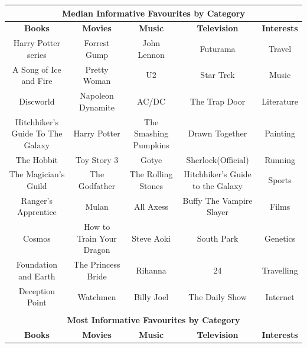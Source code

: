 
\begin{table}[t!] \centering 

{\small
\begin{tabular}{|c|c|c|c|c|}
\hline 
\multicolumn{5}{|c|}{\textbf{Median Informative Favourites by Category}}\\
\hline 
\textbf{Books} & \textbf{Movies} & \textbf{Music} & \textbf{Television} & \textbf{Interests} \\
\hline \hline
Harry Potter series&Forrest Gump&John Lennon&Futurama&Travel\\
\hline
A Song of Ice and Fire&Pretty Woman&U2&Star Trek&Music\\
\hline
Discworld&Napoleon Dynamite&AC/DC&The Trap Door&Literature\\
\hline
Hitchhiker's Guide To The Galaxy&Harry Potter&The Smashing Pumpkins&Drawn Together&Painting\\
\hline
The Hobbit&Toy Story 3&Gotye&Sherlock(Official)&Running\\
\hline
The Magician's Guild&The Godfather&The Rolling Stones&Hitchhiker's Guide to the Galaxy&Sports\\
\hline
Ranger's Apprentice&Mulan&All Axess&Buffy The Vampire Slayer&Films\\
\hline
Cosmos&How to Train Your Dragon&Steve Aoki&South Park&Genetics\\
\hline
Foundation and Earth&The Princess Bride&Rihanna&24&Travelling\\
\hline
Deception Point&Watchmen&Billy Joel&The Daily Show&Internet\\
\hline
\multicolumn{5}{c}{}\\
\hline 
\multicolumn{5}{|c|}{\textbf{Most Informative Favourites by Category}}\\
\hline
\textbf{Books} & \textbf{Movies} & \textbf{Music} & \textbf{Television} & \textbf{Interests} \\

\end{tabular}}
\end{table}
